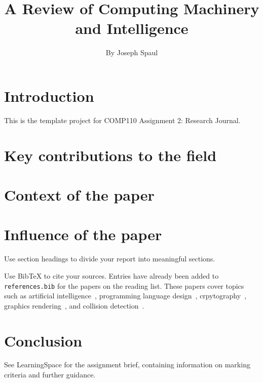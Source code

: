 \documentclass{article}
\title{A Review of Computing Machinery and Intelligence}
\author{By Joseph Spaul}
\begin{document}
\maketitle

\section{Introduction}

This is the template project for COMP110 Assignment 2: Research Journal.

\section{Key contributions to the field}

\section{Context of the paper}

\section{Influence of the paper}

Use section headings to divide your report into meaningful sections.

Use BibTeX to cite your sources. Entries have already been added to \texttt{references.bib} for the papers on the reading list.
These papers cover topics such as artificial intelligence~\cite{turing1950_intelligence, knuth1975_alphabeta}, programming language design~\cite{dijkstra1968_goto}, crpytography~\cite{rivest1978_rsa}, graphics rendering~\cite{phong1975_illumination}, and collision detection~\cite{gilbert1988_gjk}.

\section{Conclusion}

See LearningSpace for the assignment brief, containing information on marking criteria and further guidance.



\end{document}
